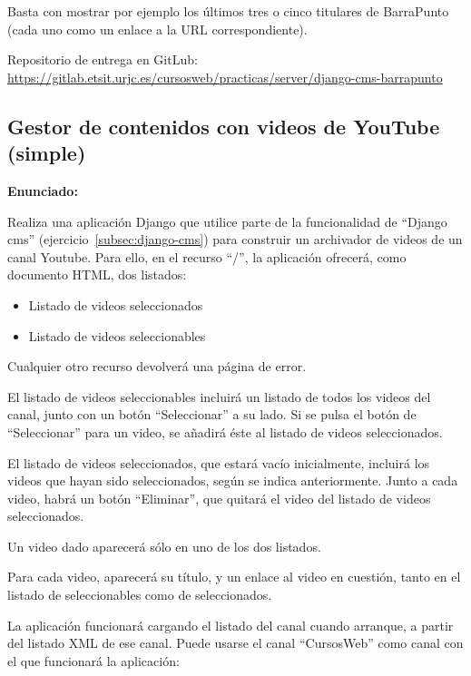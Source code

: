 Basta con mostrar por ejemplo los últimos tres o cinco titulares de BarraPunto (cada uno como un enlace a la URL correspondiente).

Repositorio de entrega en  GitLub: \\
\url{https://gitlab.etsit.urjc.es/cursosweb/practicas/server/django-cms-barrapunto}

\subsection{Gestor de contenidos con videos de YouTube (simple)}
\label{subsec:django-cms-youtube}

\textbf{Enunciado:}

Realiza una aplicación Django que utilice parte de la funcionalidad de ``Django cms'' (ejercicio~\ref{subsec:django-cms}) para construir un archivador de videos de un canal Youtube. Para ello, en el recurso ``/'', la aplicación ofrecerá, como documento HTML, dos listados:

\begin{itemize}
\item Listado de videos seleccionados
\item Listado de videos seleccionables
\end{itemize}

Cualquier otro recurso devolverá una página de error.

El listado de videos seleccionables incluirá un listado de todos los videos del canal, junto con un botón ``Seleccionar'' a su lado. Si se pulsa el botón de ``Seleccionar'' para un video, se añadirá éste al listado de videos seleccionados.

El listado de videos seleccionados, que estará vacío inicialmente, incluirá los videos que hayan sido seleccionados, según se indica anteriormente. Junto a cada video, habrá un botón ``Eliminar'', que quitará el video del listado de videos seleccionados.

Un video dado aparecerá sólo en uno de los dos listados.

Para cada video, aparecerá su título, y un enlace al video en cuestión, tanto en el listado de seleccionables como de seleccionados.

La aplicación funcionará cargando el listado del canal cuando arranque, a partir del listado XML de ese canal. Puede usarse el canal ``CursosWeb'' como canal con el que funcionará la aplicación:


